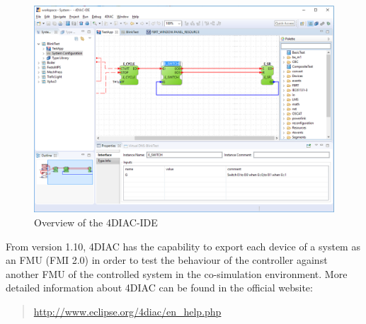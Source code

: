 %
\begin{figure}[hpt!]
  \centerline{\includegraphics[width=\textwidth]{figures/4diac-overview.png}}
  \caption{Overview of the 4DIAC-IDE}
  \label{figure:4diac-overview}
\end{figure}
%
%
From version 1.10, 4DIAC has the capability to export each device of a system as an FMU (FMI 2.0) in order to test the behaviour of the controller against another FMU of the controlled system in 
the co-simulation environment. More detailed information about 4DIAC can be found in the official website:
%
\begin{quote}
  \url{http://www.eclipse.org/4diac/en_help.php}
\end{quote} 
%
%
%
